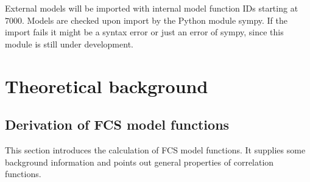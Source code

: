 External models will be imported with internal model function IDs starting at $7000$. Models are checked upon import by the Python module sympy. If the import fails it might be a syntax error or just an error of sympy, since this module is still under development. 

\section{Theoretical background}
\subsection{Derivation of FCS model functions}
This section introduces the calculation of FCS model functions. It supplies some background information and points out general properties of correlation functions.
	
